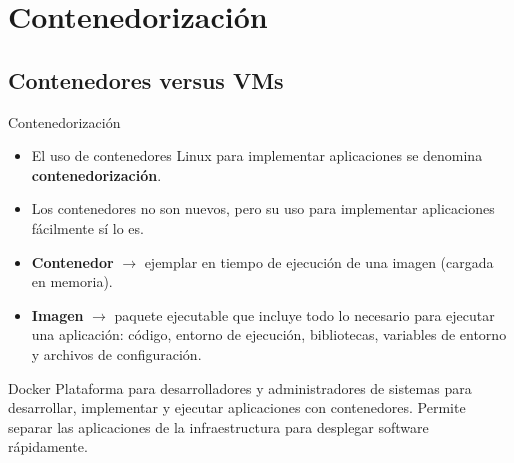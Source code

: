 \section{Contenedorización}

\subsection{Contenedores versus VMs}

\begin{frame}{Contenedorización}
 \begin{itemize}
  \item El uso de contenedores Linux para implementar aplicaciones se denomina \textbf{contenedorización}. 
  \item Los contenedores no son nuevos, pero su uso para implementar aplicaciones fácilmente sí lo es.
  \item \textbf{Contenedor} $\longrightarrow$ ejemplar en tiempo de ejecución de una imagen (cargada en memoria).
  \item \textbf{Imagen} $\longrightarrow$ paquete ejecutable que incluye todo lo necesario para ejecutar una aplicación: código, entorno de ejecución, bibliotecas, variables de entorno y archivos de configuración.
 \end{itemize}
 \begin{alertblock}{Docker}
  Plataforma para desarrolladores y administradores de sistemas para desarrollar, implementar y ejecutar aplicaciones con contenedores. Permite separar las aplicaciones de la infraestructura para desplegar software rápidamente.
 \end{alertblock}
\end{frame}

